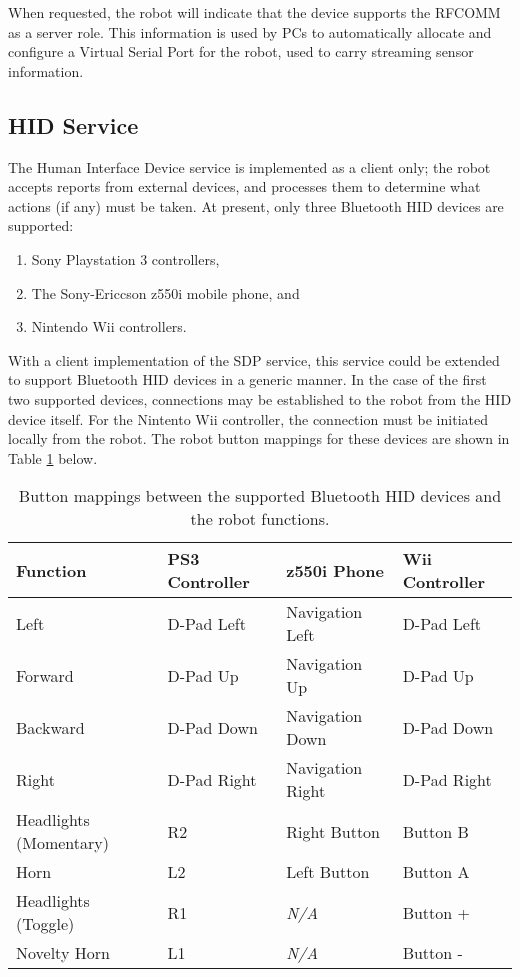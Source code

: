 When requested, the robot will indicate that the device supports the RFCOMM as a server role. This information is used by PCs to automatically allocate and configure a Virtual Serial Port for the robot, used to carry streaming sensor information.

\subsection{HID Service}

The Human Interface Device service is implemented as a client only; the robot accepts reports from external devices, and processes them to determine what actions (if any) must be taken. At present, only three Bluetooth HID devices are supported:

\begin{enumerate}
	\item Sony Playstation 3 controllers,
	\item The Sony-Ericcson z550i mobile phone, and
	\item Nintendo Wii controllers.
\end{enumerate}

With a client implementation of the SDP service, this service could be extended to support Bluetooth HID devices in a generic manner. In the case of the first two supported devices, connections may be established to the robot from the HID device itself. For the Nintento Wii controller, the connection must be initiated locally from the robot. The robot button mappings for these devices are shown in Table \ref{tab:robotbtbuttonmappings} below.

\begin{table}[H]
	\begin{center}
		\begin{tabular}{ | l | l | l | l | }
			\hline
			\textbf{Function}		& \textbf{PS3 Controller}	& \textbf{z550i Phone}	& \textbf{Wii Controller} \\ \hline

			Left					& D-Pad Left				& Navigation Left		& D-Pad Left	\\ \hline
			Forward					& D-Pad Up					& Navigation Up			& D-Pad Up		\\ \hline
			Backward				& D-Pad Down				& Navigation Down		& D-Pad Down	\\ \hline
			Right					& D-Pad Right				& Navigation Right		& D-Pad Right	\\ \hline
			Headlights (Momentary)	& R2						& Right Button			& Button B		\\ \hline
			Horn					& L2						& Left Button			& Button A		\\ \hline
			Headlights (Toggle)		& R1						& \textit{N/A}			& Button +		\\ \hline
			Novelty Horn			& L1						& \textit{N/A}			& Button -		\\ \hline

		\end{tabular}
		\caption[Bluetooth HID Robot Button Mappings]{Button mappings between the supported Bluetooth HID devices and the robot functions.}
		\label{tab:robotbtbuttonmappings}
	\end{center}
\end{table}

